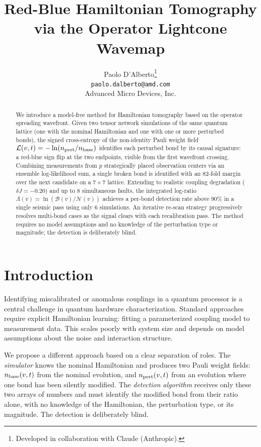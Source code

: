\documentclass[11pt]{article}
\title{\textbf{Red-Blue Hamiltonian Tomography via the Operator Lightcone Wavemap}}
\author{Paolo D'Alberto\thanks{Developed in collaboration with Claude (Anthropic).}\\
  \texttt{paolo.dalberto@amd.com}\\
  Advanced Micro Devices, Inc.
}
\date{}
\begin{document}
\maketitle

\begin{abstract}
We introduce a model-free method for Hamiltonian tomography based on the
operator spreading wavefront. Given two tensor network simulations of the same quantum lattice
(one with the nominal Hamiltonian and one with one or more perturbed bonds), the signed
cross-entropy of the non-identity Pauli weight field
$\mathcal{L}(v,t) = -\ln(n_{\rm pert}/n_{\rm base})$ identifies each perturbed
bond by its causal signature: a red-blue sign flip at the two endpoints, visible
from the first wavefront crossing.
Combining measurements from $p$ strategically placed observation centers via an
ensemble log-likelihood sum, a single broken bond is identified with an 82-fold
margin over the next candidate on a $7\times7$ lattice. Extending to realistic
coupling degradation ($\delta J = -0.20$) and up to 8 simultaneous faults, the
integrated log-ratio $\Lambda(v) = \ln(\mathcal{B}(v)/\mathcal{N}(v))$ achieves
a per-bond detection rate above 90\% in a single seismic pass using only 6
simulations. An iterative re-scan strategy progressively resolves multi-bond cases
as the signal clears with each recalibration pass.
The method requires no model assumptions and no knowledge of the perturbation
type or magnitude; the detection is deliberately blind.
\end{abstract}

\section{Introduction}

Identifying miscalibrated or anomalous couplings in a quantum processor is
a central challenge in quantum hardware characterization. Standard approaches
require explicit Hamiltonian learning: fitting a parameterized coupling model
to measurement data. This scales poorly with system size and depends on model
assumptions about the noise and interaction structure.

We propose a different approach based on a clear separation of roles.
The \emph{simulator} knows the nominal Hamiltonian and produces two Pauli
weight fields: $n_{\rm base}(v,t)$ from the nominal evolution, and
$n_{\rm pert}(v,t)$ from an evolution where one bond has been silently
modified. The \emph{detection algorithm} receives only these
two arrays of numbers and must identify the modified bond from their ratio
alone, with no knowledge of the Hamiltonian, the perturbation type, or
its magnitude. The detection is deliberately blind.
\end{document}
